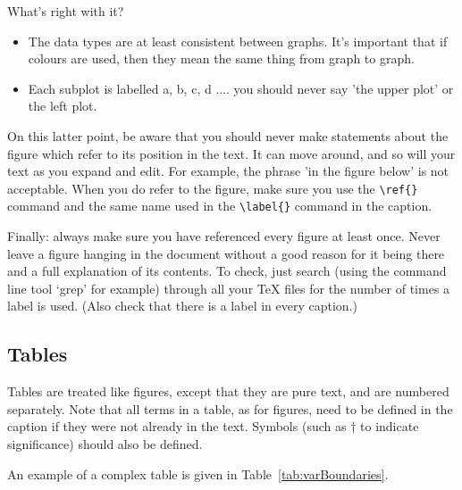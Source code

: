 What's right with it? 

\begin{itemize}
\item  The data types are at least consistent between graphs. It's important that if colours are used, then they mean the same thing from graph to graph. 
\item Each subplot is labelled a, b, c, d .... you should never say 'the upper plot' or the left plot.
\end{itemize}

On this latter point, be aware that you should never make statements about the figure which refer to its position in the text. It can move around, and so will your text as you expand and edit. For example, the phrase 'in the figure below' is not acceptable. When you do refer to the figure, make sure you use the \verb|\ref{}|  command and the same name used in the \verb|\label{}| 
 command in the caption. 

Finally: always make sure you have referenced every figure at least once. Never leave a figure hanging in the document without a good reason for it being there and a full explanation of its contents. To check, just search (using the command line tool `grep' for example) through all your TeX files for the number of times a label is used. (Also check that there is a label in every caption.)



\subsection{Tables}
\label{sec:tables}

Tables are treated like figures, except that they are pure text, and
are numbered separately. Note that all terms in a table, as for figures, 
need to be defined in the caption if they were not already in the text.
Symbols (such as $\dag$ to indicate significance) should also be defined. 

An example of a complex table is given in Table~\ref{tab:varBoundaries}. 


